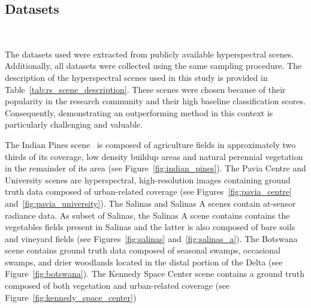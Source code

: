 \documentclass[parskip=full]{scrartcl}
\begin{document}
\subsection{Datasets}~\label{sec:datasets}

The datasets used were extracted from publicly available hyperspectral scenes.
Additionally, all datasets were collected using the same sampling procedure.
The description of the hyperspectral scenes used in this study is provided in
Table~\ref{tab:rs_scene_description}. These scenes were chosen because of their
popularity in the research community and their high baseline classification
scores. Consequently, demonstrating an outperforming method in this context is
particularly challenging and valuable.


The Indian Pines scene~\cite{Baumgardner2015} is composed of agriculture fields
in approximately two thirds of its coverage, low density buildup areas and
natural perennial vegetation in the remainder of its area (see
Figure~\ref{fig:indian_pines}). The Pavia Centre and University scenes are
hyperspectral, high-resolution images containing ground truth data composed of
urban-related coverage (see Figures~\ref{fig:pavia_centre}
and~\ref{fig:pavia_university}). The Salinas and Salinas A scenes contain
at-sensor radiance data. As subset of Salinas, the Salinas A scene contains
contains the vegetables fields present in Salinas and the latter is also
composed of bare soils and vineyard fields (see Figures~\ref{fig:salinas}
and~\ref{fig:salinas_a}). The Botswana scene contains ground truth data
composed of seasonal swamps, occasional swamps, and drier woodlands located in
the distal portion of the Delta (see Figure~\ref{fig:botswana}). The Kennedy
Space Center scene contains a ground truth composed of both vegetation and
urban-related coverage (see Figure~\ref{fig:kennedy_space_center})
\end{document}
